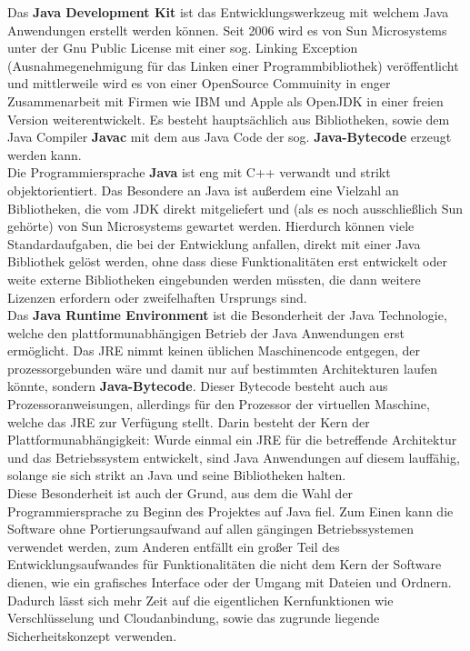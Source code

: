 \documentclass[12pt,a4paper,bibliography=totocnumbered,listof=totocnumbered]{scrartcl}
\begin{document}
Das \textbf{Java Development Kit} ist das Entwicklungswerkzeug mit welchem Java Anwendungen erstellt werden können. Seit 2006 wird es von Sun Microsystems unter der Gnu Public License mit einer sog. Linking Exception (Ausnahmegenehmigung für das Linken einer Programmbibliothek) veröffentlicht und mittlerweile wird es von einer OpenSource Commuinity in enger Zusammenarbeit mit Firmen wie IBM und Apple als OpenJDK in einer freien Version weiterentwickelt. Es besteht hauptsächlich aus Bibliotheken, sowie dem Java Compiler \textbf{Javac} mit dem aus Java Code der sog. \textbf{Java-Bytecode} erzeugt werden kann.\\
Die Programmiersprache \textbf{Java} ist eng mit C++ verwandt und strikt objektorientiert. Das Besondere an Java ist außerdem eine Vielzahl an Bibliotheken, die vom JDK direkt mitgeliefert und (als es noch ausschließlich Sun gehörte) von Sun Microsystems gewartet werden. Hierdurch können viele Standardaufgaben, die bei der Entwicklung anfallen, direkt mit einer Java Bibliothek gelöst werden, ohne dass diese Funktionalitäten erst entwickelt oder weite externe Bibliotheken eingebunden werden müssten, die dann weitere Lizenzen erfordern oder zweifelhaften Ursprungs sind.\\
Das \textbf{Java Runtime Environment} ist die Besonderheit der Java Technologie, welche den plattformunabhängigen Betrieb der Java Anwendungen erst ermöglicht. Das  JRE nimmt keinen üblichen Maschinencode entgegen, der prozessorgebunden wäre und damit nur auf bestimmten Architekturen laufen könnte, sondern \textbf{Java-Bytecode}. Dieser Bytecode besteht auch aus Prozessoranweisungen, allerdings für den Prozessor der virtuellen Maschine, welche das JRE zur Verfügung stellt. Darin besteht der Kern der Plattformunabhängigkeit: Wurde einmal ein JRE für die betreffende Architektur und das Betriebssystem entwickelt, sind Java Anwendungen auf diesem lauffähig, solange sie sich strikt an Java und seine Bibliotheken halten.\\
Diese Besonderheit ist auch der Grund, aus dem die Wahl der Programmiersprache zu Beginn des Projektes auf Java fiel. Zum Einen kann die Software ohne Portierungsaufwand auf allen gängingen Betriebssystemen verwendet werden, zum Anderen entfällt ein großer Teil des Entwicklungsaufwandes für Funktionalitäten die nicht dem Kern der Software dienen, wie ein grafisches Interface oder der Umgang mit Dateien und Ordnern. Dadurch lässt sich mehr Zeit auf die eigentlichen Kernfunktionen wie Verschlüsselung und Cloudanbindung,  sowie das zugrunde liegende Sicherheitskonzept verwenden. \cite{1}\cite{2}\\\cite{3}
\end{document}
